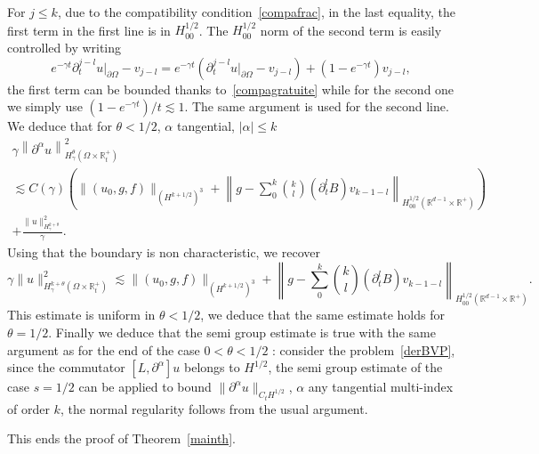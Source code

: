 \documentclass[10pt]{amsart}
\theoremstyle{definition}\newtheorem{defi}[theo]{Definition}\newtheorem{rema}[theo]{Remark}\newtheorem{exam}[theo]{Example}\newtheorem{exem}[theo]{Example}\newtheorem{nota}[theo]{Notation}
\newcommand{\R}{\mathbb{R}}
\begin{document}
\endgroup
For $j\leq k$, due to the compatibility condition~\eqref{compafrac}, in the last equality, the first term in the first line is in $H^{1/2}_{00}$. The $H^{1/2}_{00}$ norm of the second term is easily controlled by writing
\[
e^{-\gamma t}\partial_t^{j-l}u|_{\partial\Omega}-v_{j-l} =e^{-\gamma t}\left(\partial_t^{j-l}u|_{\partial\Omega}- v_{j-l}\right)+\left(1-e^{-\gamma t}\right)v_{j-l},
\]
the first term can be bounded thanks to~\eqref{compagratuite} while for the second one we simply use $(1-e^{-\gamma t})/t
\lesssim 1$. The same argument is used for the second line. We deduce that for $\theta <1/2$, $\alpha$ tangential, $|\alpha|\leq k$
\begin{multline*}
\gamma\left\|\partial^\alpha u\right\|^2 _{H^{\theta}_\gamma\left(\Omega\times \R_t^+\right)} \\
\lesssim C(\gamma)\left(\|(u_0,g,f)\|_{\left(H^{k+1/2}\right)^3} +\left\|g -\sum_0^k\binom{k}{l}\left(\partial_t^lB\right) v_{k-1-l}\right\|_{H^{1/2}_{00} \left(\R^{d-1}\times \R^+\right)}\right)\\
+\frac{\|u\|_{H^{k+\theta}_\gamma}^2}{\gamma}.
\end{multline*}
Using that the boundary is non characteristic, we recover
\[
\gamma\|u\|^2 _{H^{k+\theta}_\gamma\left(\Omega\times \R_t^+\right)} \lesssim \|(u_0,g,f)\|_{\left(H^{k+1/2}\right)^3} +\left\|g -\sum_0^k\binom{k}{l}(\partial_t^lB) v_{k-1-l}\right\|_{H^{1/2}_{00} \left(\R^{d-1}\times \R^+\right)}.
\]
This estimate is uniform in $\theta <1/2$, we deduce that the same estimate holds for $\theta =1/2$. Finally we deduce that the semi group estimate is true with the same argument as for the end of the case $0<\theta <1/2$ : consider the problem~\eqref{derBVP}, since the commutator $[L,\partial^\alpha]u$ belongs to $H^{1/2}$, the semi group estimate of the case $s=1/2$ can be applied to bound $\|\partial^\alpha u\|_{C_tH^{1/2}}$, $\alpha$ any tangential multi-index of order $k$, the normal regularity follows from the usual argument.


This ends the proof of Theorem~\ref{mainth}.
\end{document}
